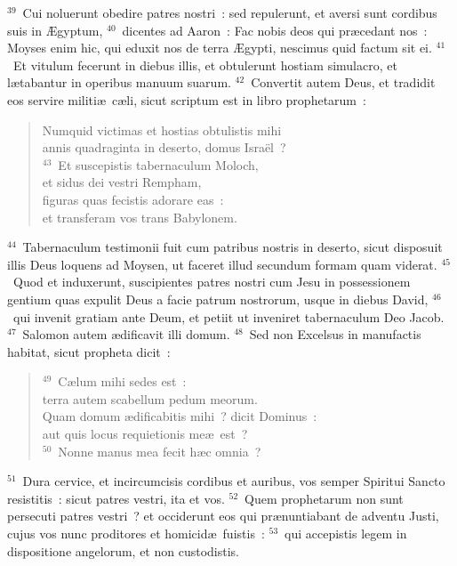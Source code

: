 ${}^{39}$~Cui noluerunt obedire patres nostri~: sed repulerunt, et aversi sunt cordibus suis in \AE gyptum,
${}^{40}$~dicentes ad Aaron~: Fac nobis deos qui pr\ae cedant nos~: Moyses enim hic, qui eduxit nos de terra \AE gypti, nescimus quid factum sit ei.
${}^{41}$~Et vitulum fecerunt in diebus illis, et obtulerunt hostiam simulacro, et l\ae tabantur in operibus manuum suarum.
${}^{42}$~Convertit autem Deus, et tradidit eos servire militi\ae\ c\ae li, sicut scriptum est in libro prophetarum~: \begin{flushleft}\begin{verse}Numquid victimas et hostias obtulistis mihi\\ annis quadraginta in deserto, domus Isra\"el~?\\
${}^{43}$~Et suscepistis tabernaculum Moloch,\\ et sidus dei vestri Rempham,\\ figuras quas fecistis adorare eas~:\\ et transferam vos trans Babylonem.\end{verse}\end{flushleft}


${}^{44}$~Tabernaculum testimonii fuit cum patribus nostris in deserto, sicut disposuit illis Deus loquens ad Moysen, ut faceret illud secundum formam quam viderat.
${}^{45}$~Quod et induxerunt, suscipientes patres nostri cum Jesu in possessionem gentium quas expulit Deus a facie patrum nostrorum, usque in diebus David,
${}^{46}$~qui invenit gratiam ante Deum, et petiit ut inveniret tabernaculum Deo Jacob.
${}^{47}$~Salomon autem \ae dificavit illi domum.
${}^{48}$~Sed non Excelsus in manufactis habitat, sicut propheta dicit~:
\begin{flushleft}\begin{verse}${}^{49}$~C\ae lum mihi sedes est~:\\ terra autem scabellum pedum meorum.\\ Quam domum \ae dificabitis mihi~? dicit Dominus~:\\ aut quis locus requietionis me\ae\ est~?\\
${}^{50}$~Nonne manus mea fecit h\ae c omnia~?\end{verse}\end{flushleft}


${}^{51}$~Dura cervice, et incircumcisis cordibus et auribus, vos semper Spiritui Sancto resistitis~: sicut patres vestri, ita et vos.
${}^{52}$~Quem prophetarum non sunt persecuti patres vestri~? et occiderunt eos qui pr\ae nuntiabant de adventu Justi, cujus vos nunc proditores et homicid\ae\ fuistis~:
${}^{53}$~qui accepistis legem in dispositione angelorum, et non custodistis.


